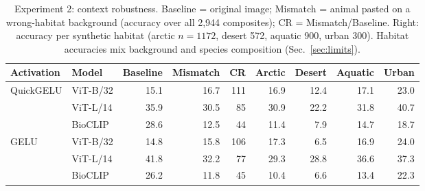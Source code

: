 \begin{table}[t]
\caption{Experiment 2: context robustness. Baseline = original image; Mismatch = animal pasted on a wrong-habitat background (accuracy over all 2,944 composites); CR = Mismatch/Baseline. Right: accuracy per synthetic habitat (arctic $n{=}1172$, desert 572, aquatic 900, urban 300). Habitat accuracies mix background and species composition (Sec.~\ref{sec:limits}).}
\label{tab:mismatch}
\centering\footnotesize
\setlength{\tabcolsep}{4pt}
\begin{tabular}{ll rrr rrrr}
\toprule
Activation & Model & Baseline & Mismatch & CR & Arctic & Desert & Aquatic & Urban \\
\midrule
QuickGELU & ViT-B/32 & 15.1 & 16.7 & 111 & 16.9 & 12.4 & 17.1 & 23.0 \\
 & ViT-L/14 & 35.9 & 30.5 & 85 & 30.9 & 22.2 & 31.8 & 40.7 \\
 & BioCLIP & 28.6 & 12.5 & 44 & 11.4 & 7.9 & 14.7 & 18.7 \\
\midrule
GELU & ViT-B/32 & 14.8 & 15.8 & 106 & 17.3 & 6.5 & 16.9 & 24.0 \\
 & ViT-L/14 & 41.8 & 32.2 & 77 & 29.3 & 28.8 & 36.6 & 37.3 \\
 & BioCLIP & 26.2 & 11.8 & 45 & 10.4 & 6.6 & 13.4 & 22.3 \\
\bottomrule
\end{tabular}
\end{table}
